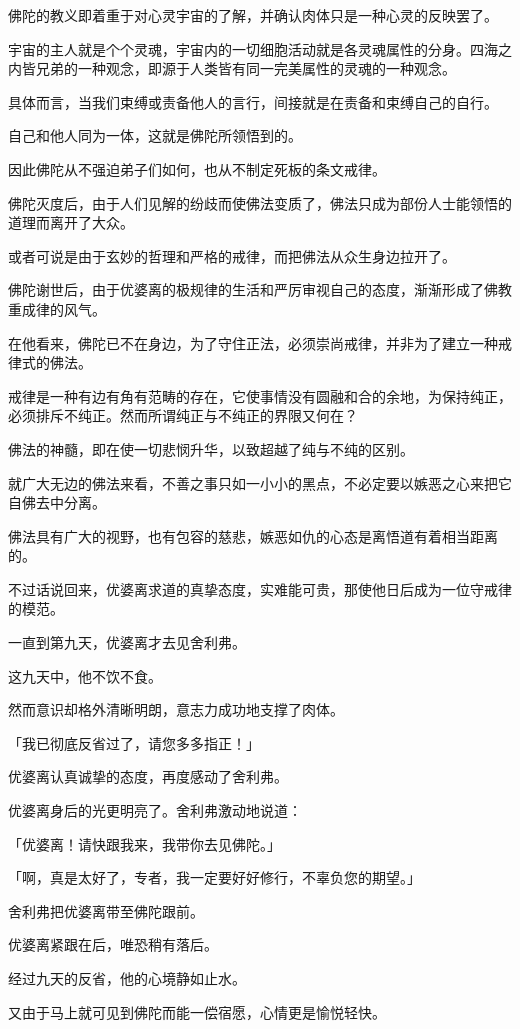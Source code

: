 \documentclass[twoside,openany]{book}
\begin{document}
佛陀的教义即着重于对心灵宇宙的了解，并确认肉体只是一种心灵的反映罢了。

宇宙的主人就是个个灵魂，宇宙内的一切细胞活动就是各灵魂属性的分身。四海之内皆兄弟的一种观念，即源于人类皆有同一完美属性的灵魂的一种观念。

具体而言，当我们束缚或责备他人的言行，间接就是在责备和束缚自己的自行。

自己和他人同为一体，这就是佛陀所领悟到的。

因此佛陀从不强迫弟子们如何，也从不制定死板的条文戒律。

佛陀灭度后，由于人们见解的纷歧而使佛法变质了，佛法只成为部份人士能领悟的道理而离开了大众。

或者可说是由于玄妙的哲理和严格的戒律，而把佛法从众生身边拉开了。

佛陀谢世后，由于优婆离的极规律的生活和严厉审视自己的态度，渐渐形成了佛教重成律的风气。

在他看来，佛陀已不在身边，为了守住正法，必须崇尚戒律，并非为了建立一种戒律式的佛法。

戒律是一种有边有角有范畴的存在，它使事情没有圆融和合的余地，为保持纯正，必须排斥不纯正。然而所谓纯正与不纯正的界限又何在？

佛法的神髓，即在使一切悲悯升华，以致超越了纯与不纯的区别。

就广大无边的佛法来看，不善之事只如一小小的黑点，不必定要以嫉恶之心来把它自佛去中分离。

佛法具有广大的视野，也有包容的慈悲，嫉恶如仇的心态是离悟道有着相当距离的。

不过话说回来，优婆离求道的真挚态度，实难能可贵，那使他日后成为一位守戒律的模范。

一直到第九天，优婆离才去见舍利弗。

这九天中，他不饮不食。

然而意识却格外清晰明朗，意志力成功地支撑了肉体。

「我已彻底反省过了，请您多多指正！」

优婆离认真诚挚的态度，再度感动了舍利弗。

优婆离身后的光更明亮了。舍利弗激动地说道：

「优婆离！请快跟我来，我带你去见佛陀。」

「啊，真是太好了，专者，我一定要好好修行，不辜负您的期望。」

舍利弗把优婆离带至佛陀跟前。

优婆离紧跟在后，唯恐稍有落后。

经过九天的反省，他的心境静如止水。

又由于马上就可见到佛陀而能一偿宿愿，心情更是愉悦轻快。
\end{document}
